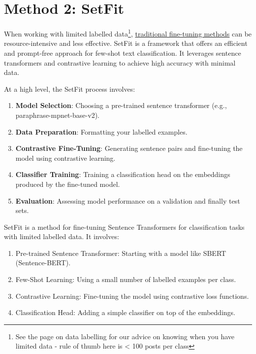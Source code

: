 \documentclass[
  letterpaper,
  DIV=11,
  numbers=noendperiod]{scrreprt}
\providecommand{\tightlist}{%
  \setlength{\itemsep}{0pt}\setlength{\parskip}{0pt}}\usepackage{longtable,booktabs,array}
\begin{document}
\chapter{Method 2: SetFit}\label{method-2-setfit}

When working with limited labelled data\footnote{See the page on data
  labelling for our advice on knowing when you have limited data - rule
  of thumb here is \textless{} 100 posts per class},
\href{./vanilla_finetuning.qmd}{traditional fine-tuning methods} can be
resource-intensive and less effective. SetFit is a framework that offers
an efficient and prompt-free approach for few-shot text classification.
It leverages sentence transformers and contrastive learning to achieve
high accuracy with minimal data.

At a high level, the SetFit process involves:

\begin{enumerate}
\def\labelenumi{\arabic{enumi}.}
\tightlist
\item
  \textbf{Model Selection}: Choosing a pre-trained sentence transformer
  (e.g., paraphrase-mpnet-base-v2).
\item
  \textbf{Data Preparation}: Formatting your labelled examples.
\item
  \textbf{Contrastive Fine-Tuning}: Generating sentence pairs and
  fine-tuning the model using contrastive learning.
\item
  \textbf{Classifier Training}: Training a classification head on the
  embeddings produced by the fine-tuned model.
\item
  \textbf{Evaluation}: Assessing model performance on a validation and
  finally test sets.
\end{enumerate}

SetFit is a method for fine-tuning Sentence Transformers for
classification tasks with limited labelled data. It involves:

\begin{enumerate}
\def\labelenumi{\arabic{enumi}.}
\tightlist
\item
  Pre-trained Sentence Transformer: Starting with a model like SBERT
  (Sentence-BERT).
\item
  Few-Shot Learning: Using a small number of labelled examples per
  class.
\item
  Contrastive Learning: Fine-tuning the model using contrastive loss
  functions.
\item
  Classification Head: Adding a simple classifier on top of the
  embeddings.
\end{enumerate}
\end{document}
